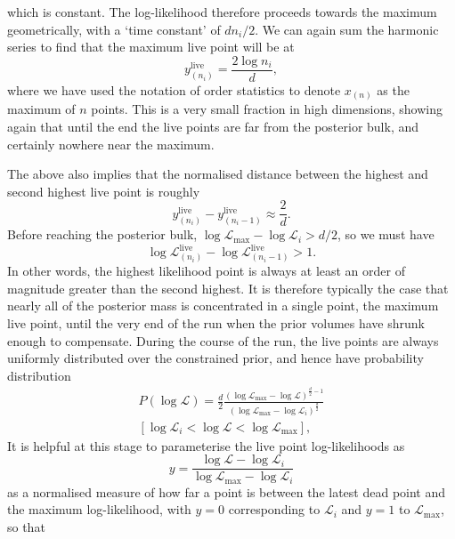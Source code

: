 \documentclass[usenatbib]{mnras}
\newcommand{\nlive}{n_i}
\newcommand{\Like}{\mathcal{L}}
\newcommand{\logLmax}{\log \Like_\mathrm{max}}
\begin{document}
which is constant. The log-likelihood therefore proceeds towards the maximum geometrically, with a `time constant' of $dn_i/2$. We can again sum the harmonic series to find that the maximum live point will be at
\begin{equation}
    y_{(\nlive)}^{\mathrm{live}} = \frac{2\log \nlive}{d},
\end{equation}
where we have used the notation of order statistics to denote $x_{(n)}$ as the maximum of $n$ points. This is a very small fraction in high dimensions, showing again that until the end the live points are far from the posterior bulk, and certainly nowhere near the maximum.
\par
The above also implies that the normalised distance between the highest and second highest live point is roughly 
\begin{equation}
    y_{(\nlive)}^{\mathrm{live}} - y_{(\nlive - 1)}^{\mathrm{live}} \approx \frac{2}{d}.
\end{equation}
Before reaching the posterior bulk, $\logLmax - \log\Like_i > d/2$, so we must have
\begin{equation}
    \log \Like^{\mathrm{live}}_{(\nlive)} - \log \Like^\mathrm{live}_{(\nlive - 1)} > 1.
\end{equation}
In other words, the highest likelihood point is always at least an order of magnitude greater than the second highest. It is therefore typically the case that nearly all of the posterior mass is concentrated in a single point, the maximum live point, until the very end of the run when the prior volumes have shrunk enough to compensate.
During the course of the run, the live points are always uniformly distributed over the constrained prior, and hence have probability distribution
\begin{multline}
	P(\log\mathcal{L}) = \frac{d}{2}\frac{(\log\mathcal{L}_\mathrm{max}-\log\mathcal{L})^{\frac{d}{2}-1}}{(\log\mathcal{L}_\mathrm{max}-\log\mathcal{L}_i)^{\frac{d}{2}}} \\
    [\log\mathcal{L}_i < \log\mathcal{L} <\log\mathcal{L}_\mathrm{max}],
    \label{eq:PL}
\end{multline}
It is helpful at this stage to parameterise the live point log-likelihoods as
\begin{equation}
    y = \frac{\log\mathcal{L}-\log\mathcal{L}_i}{\log\mathcal{L}_\mathrm{max}-\log\mathcal{L}_i}
    \label{eq:y}
\end{equation}
as a normalised measure of how far a point is between the latest dead point and the maximum log-likelihood, with $y=0$ corresponding to $\mathcal{L}_i$ and $y=1$ to $\mathcal{L}_\mathrm{max}$, so that
\end{document}
